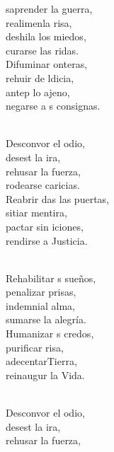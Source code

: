 \begin{cancion}%
	saprender la guerra, \\
	realimenla risa, \\
	deshila los miedos, \\
	curarse las ridas. \\
	Difuminar onteras,\\
	rehuir de ldicia, \\
	antep lo ajeno,\\
	negarse a s consignas. \\\jump\\
	\begin{chorus}%
	Desconvor el odio,\\
	desest la ira, \\
	rehusar  la fuerza, \\
	rodearse  caricias. \\
	Reabrir das las puertas, \\
	sitiar  mentira, \\
	pactar sin iciones,\\
	rendirse a  Justicia.\\
	\end{chorus}%
	\jump\\
	Rehabilitar s sueños, \\
	penalizar prisas, \\
	indemnial alma, \\
	sumarse la alegría. \\
	Humanizar s credos, \\
	purificar risa, \\
	adecentarTierra,\\
	reinaugur la Vida. \\\jump\\
	\begin{chorus}%
	Desconvor el odio,\\
	desest la ira, \\
	rehusar  la fuerza, \\

\end{chorus}
\end{cancion}
